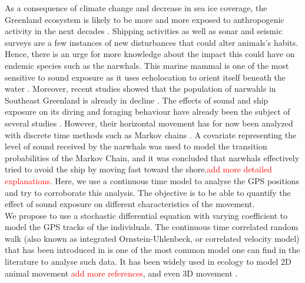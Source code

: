 \documentclass[11pt]{article}
\newcommand {\1}{\mathbb{1}}
\begin{document}
As a consequence of climate change and decrease in sea ice coverage, the Greenland ecosystem is likely to be more and more exposed to anthropogenic activity in the next decades \cite{heide-jorgensen_behavioral_2021}. Shipping activities as well as sonar and seismic surveys are a few instances of new disturbances that could alter animals's habits.  Hence, there is an urge for more knowledge about the impact this could have on endemic species such as the narwhals. This marine mammal is one of the most sensitive to sound exposure as it uses echolocation to orient itself beneath the water \cite{tervo_narwhals_2021}. Moreover, recent studies showed that the population of narwahls in Southeast Greenland is already in decline \cite{garde_biological_2022}. The effects of sound and ship exposure on its diving and foraging behaviour have already been the subject of several studies \cite{heide-jorgensen_behavioral_2021,ngo_understanding_2019}. However, their horizontal movement has for now been analyzed with discrete time methods such as Markov chains  \cite{heide-jorgensen_behavioral_2021}. A covariate representing the level of sound received by the narwhals was used to model the transition probabilities of the Markov Chain, and it was concluded that narwhals effectively tried to avoid the ship by moving fast toward the shore.\textcolor{red}{add more detailed explanations}. Here, we use a continuous time model to analyse the GPS positions and try to corroborate this analysis. The objective is to be able to quantify  the effect of sound exposure on different characteristics of the movement.\\


We propose to use a stochastic differential equation with varying coefficient to model the GPS tracks of the individuals. The continuous time correlated random walk (also known as integrated Ornstein-Uhlenbeck, or correlated velocity model) that has been introduced in \cite{johnson_continuous_2008} is one of the most common model one can find in the literature to analyse such data. It has been  widely used in ecology to model 2D animal movement \cite{gurarie_correlated_2017,albertsen_generalizing_2019} \textcolor{red}{add more references}, and even 3D movement \cite{gurarie_estimating_2011}.
\end{document}
